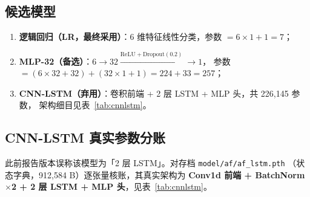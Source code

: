 \documentclass[11pt,a4paper]{ctexart}
\newcommand{\feat}[1]{\texttt{#1}}
\begin{document}
\subsection{候选模型}
\label{sec:candidates}

\begin{enumerate}
  \item \textbf{逻辑回归（LR，最终采用）}：6 维特征线性分类，参数 $= 6\times 1 + 1 = 7$；
  \item \textbf{MLP-32（备选）}：$6 \rightarrow 32 \xrightarrow{\mathrm{ReLU}+\mathrm{Dropout}(0.2)} \rightarrow 1$，
        参数 $= (6\times32+32) + (32\times1+1) = 224 + 33 = 257$；
  \item \textbf{CNN-LSTM（弃用）}：卷积前端 + 2 层 LSTM + MLP 头，共 226{,}145 参数，
        架构细目见表~\ref{tab:cnnlstm}。
\end{enumerate}

\subsection{CNN-LSTM 真实参数分账}
\label{sec:cnnlstm-params}

此前报告版本误称该模型为「2 层 LSTM」。对存档 \feat{model/af/af\_lstm.pth}
（状态字典，912{,}584 B）逐张量核账，其真实架构为
\textbf{Conv1d 前端 + BatchNorm $\times$2 + 2 层 LSTM + MLP 头}，见表~\ref{tab:cnnlstm}。
\end{document}
